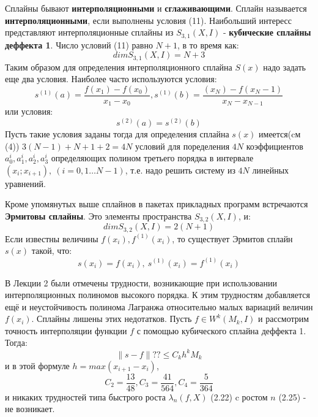 Сплайны бывают \textbf{интерполяционными} и \textbf{сглаживающими}. Сплайн называется \textbf{интерполяционными}, если выполнены условия (11).
Наибольший интересс представляют интерполяционные сплайны из $S_{3,1}(X,I)$ - \textbf{кубические сплайны деффекта 1}. Число условий (11) равно $N+1$, в то время как:
\begin{equation}
dim  S_{3,1}(X,I) = N+3
\end{equation}
Таким образом для определения интерполяционного сплайна $S(x)$ надо задать еще два условия. Наиболее часто используются условия:
\begin{equation}
s^{( 1) }(a) =\dfrac{f\left( x_{1}\right) -f\left( x_{0}\right) }{x_{1}-x_{0}},s^{\left( 1\right) }\left( b\right) =\dfrac{\left( x_{N}\right)-f( x_{N}-1)}{x_{N}-x_{N-1}}
\end{equation}
или условия:
\begin{equation}
s^{(2) }(a) =s^{(2) }(b) 
\end{equation}
Пусть такие условия заданы тогда для определения сплайна $s(x)$ имеется(cм (4)) $3(N-1)+N+1+2=4N$ условий для поределения $4N$ коэффициентов $a^i_0,a^i_1,a^i_2,a^i_3$ определяющих полином третьего порядка в интервале $(x_i;x_{i+1}), \ (i=0,1\ldots N-1)$, т.е. надо решить систему из $4N$ линейных уравнений. 

Кроме упомянутых выше сплайнов в пакетах прикладных программ встречаются \textbf{Эрмитовы сплайны}. Это элементы пространства $S_{3,2}(X,I)$, и:
\begin{equation}
dim  S_{3,2}(X,I) = 2(N+1)
\end{equation}
Если известны величины $f(x_i),f^{(1)}(x_i)$, то существует Эрмитов сплайн $s(x)$ такой, что:
\begin{equation}
s(x_i)=f(x_i), \ s^{(1)}(x_i)=f^{(1)}(x_i)
\end{equation}

В Лекции 2 были отмечены трудности, возникающие при использовании интерполяционных полиномов высокого порядка. К этим трудностям добавляется ещё и неустойчивость полинома Лагранжа относительно малых вариаций величин $f(x_i)$.
Сплайны лишены этих недотатков. Пусть $f\in W^k(M_k,I)$ и рассмотрим точность интерполяции функции $f$ с помощью кубического сплайна деффекта 1. Тогда:
\begin{equation}
\parallel s-f\parallel ?? \leq C_k h^k M_k
\end{equation}
и в этой формуле $h=max(x_{i+1}-x_i)$,
\begin{equation}
C_{2}=\dfrac{13}{48},C_{3}=\dfrac{41}{564},C_{4}=\dfrac{5}{364}
\end{equation}
и никаких трудностей типа быстрого роста $\lambda_n(f,X)$ (2.22) c ростом $n$ (2.25) - не возникает.

